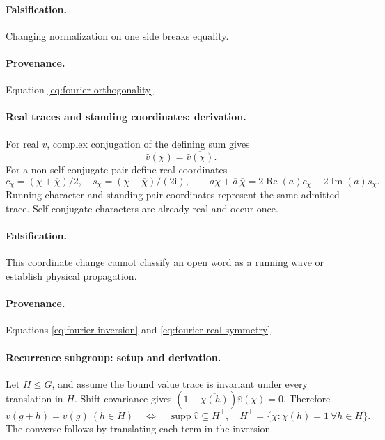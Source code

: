 \paragraph{Falsification.} Changing normalization on one side breaks equality.
\paragraph{Provenance.} Equation \eqref{eq:fourier-orthogonality}.

\paragraph{Real traces and standing coordinates: derivation.}
For real \(v\), complex conjugation of the defining sum gives
\begin{equation}
\widehat v(\overline\chi)=\overline{\widehat v(\chi)}.
\label{eq:fourier-real-symmetry}
\end{equation}
For a non-self-conjugate pair define real coordinates
\begin{equation}
c_\chi=(\chi+\overline\chi)/2,\quad
s_\chi=(\chi-\overline\chi)/(2\mathrm i),\qquad
a\chi+\overline a\,\overline\chi
=2\operatorname{Re}(a)c_\chi-2\operatorname{Im}(a)s_\chi.
\label{eq:fourier-running-standing}
\end{equation}
Running character and standing pair coordinates represent the same admitted
trace. Self-conjugate characters are already real and occur once.
\paragraph{Falsification.} This coordinate change cannot classify an open
word as a running wave or establish physical propagation.
\paragraph{Provenance.} Equations \eqref{eq:fourier-inversion} and
\eqref{eq:fourier-real-symmetry}.

\paragraph{Recurrence subgroup: setup and derivation.}
Let \(H\le G\), and assume the bound value trace is invariant under every
translation in \(H\). Shift covariance gives
\((1-\overline{\chi(h)})\widehat v(\chi)=0\). Therefore
\begin{equation}
v(g+h)=v(g)\ (h\in H)
\quad\Longleftrightarrow\quad
\operatorname{supp}\widehat v\subseteq H^\perp,
\quad H^\perp=\{\chi:\chi(h)=1\ \forall h\in H\}.
\label{eq:fourier-recurrence-support}
\end{equation}
The converse follows by translating each term in the inversion.
